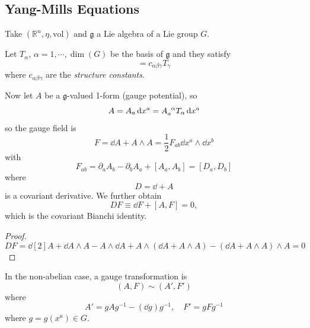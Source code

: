 \documentclass[a4paper,11pt]{article}
\begin{document}
    \subsection{Yang-Mills Equations}
    Take $(\mathbb{R}^n, \eta, \text{vol})$ and $\mathfrak{g}$ a Lie algebra of a Lie group $G$. 

    Let $T_\alpha$, $\alpha = 1, \cdots, \dim(G)$ be the basis of $\mathfrak{g}$ and they satisfy 
    \begin{equation}
        [T_\alpha, T_\beta] = c_{\alpha \beta \gamma} T_\gamma
    \end{equation} 
    where $c_{\alpha \beta \gamma}$ are the \emph{structure constants}.

    Now let $A$ be a $\mathfrak{g}$-valued 1-form (gauge potential), so 
    \begin{equation}
        A = A_a \dd{x^a} = A\indices{_a^\alpha} T_\alpha \dd{x^a}
    \end{equation}
    so the gauge field is 
    \begin{equation}
        F = \dd{A} + A \wedge A = \frac{1}{2} F_{ab} \dd{x^a} \wedge \dd{x^b}
    \end{equation}
    with
    \begin{equation}
        F_{ab} = \partial_a A_b - \partial_b A_a + [A_a, A_b] = [D_a, D_b]
    \end{equation}
    where 
    \begin{equation}
        D = \dd{} + A
    \end{equation}
    is a covariant derivative. We further obtain 
    \begin{equation}
        D F \equiv \dd{F} + [A,F] = 0,
    \end{equation}
    which is the covariant Bianchi identity.
    \begin{proof}
        \begin{equation}
            D F = \dd[2]{A} + \dd{A} \wedge A - A \wedge \dd{A} + A \wedge (\dd{A} + A \wedge A) - (\dd{A} + A \wedge A) \wedge A = 0
        \end{equation}
    \end{proof}
    
    In the non-abelian case, a gauge transformation is 
    \begin{equation}
        (A,F) \sim (A',F')
    \end{equation}
    where 
    \begin{equation}
        A' = g A g^{-1} - (\dd{g}) g^{-1}, \quad F' = g F g^{-1}
    \end{equation}
    where $g = g(x^a) \in G$.
\end{document}
